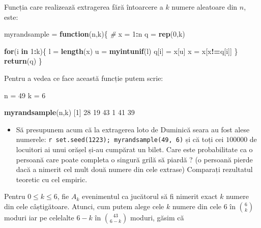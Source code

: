 \documentclass[]{article}
\newenvironment{Shaded}{\begin{snugshade}}{\end{snugshade}}
\newcommand{\CommentTok}[1]{\textcolor[rgb]{0.56,0.35,0.01}{\textit{#1}}}
\newcommand{\ControlFlowTok}[1]{\textcolor[rgb]{0.13,0.29,0.53}{\textbf{#1}}}
\newcommand{\DecValTok}[1]{\textcolor[rgb]{0.00,0.00,0.81}{#1}}
\newcommand{\KeywordTok}[1]{\textcolor[rgb]{0.13,0.29,0.53}{\textbf{#1}}}
\newcommand{\NormalTok}[1]{#1}
\newcommand{\OperatorTok}[1]{\textcolor[rgb]{0.81,0.36,0.00}{\textbf{#1}}}
\newcommand{\StringTok}[1]{\textcolor[rgb]{0.31,0.60,0.02}{#1}}
\newenvironment{frshaded*}{%
  \def\FrameCommand{\fboxrule=\FrameRule\fboxsep=\FrameSep \fcolorbox{framecolor}{shadecolor1}}%
  \MakeFramed {\advance\hsize-\width \FrameRestore}}%
{\endMakeFramed}
\newenvironment{rmdblock}[1]
  {\begin{frshaded*}
  \begin{itemize}
  \renewcommand{\labelitemi}{
    \raisebox{-.7\height}[0pt][0pt]{
      {\setkeys{Gin}{width=2em,keepaspectratio}\texttt{[image: images/icons/\#1]}}
    }
  }
  \item
  }
  {
  \end{itemize}
  \end{frshaded*}
  }
\newenvironment{rmdexercise}
  {\begin{rmdblock}{exercise}}
  {\end{rmdblock}}
\begin{document}
Funcția care realizează extragerea fără întoarcere a \(k\) numere
aleatoare din \(n\), este:

\begin{Shaded}
\begin{Highlighting}[]
\NormalTok{myrandsample =}\StringTok{ }\ControlFlowTok{function}\NormalTok{(n,k)\{}
  \CommentTok{# }
\NormalTok{  x =}\StringTok{ }\DecValTok{1}\OperatorTok{:}\NormalTok{n}
\NormalTok{  q =}\StringTok{ }\KeywordTok{rep}\NormalTok{(}\DecValTok{0}\NormalTok{,k)}
  
  \ControlFlowTok{for}\NormalTok{(i }\ControlFlowTok{in} \DecValTok{1}\OperatorTok{:}\NormalTok{k)\{}
\NormalTok{    l =}\StringTok{ }\KeywordTok{length}\NormalTok{(x)}
\NormalTok{    u =}\StringTok{ }\KeywordTok{myintunif}\NormalTok{(l)}
\NormalTok{    q[i] =}\StringTok{ }\NormalTok{x[u]}
\NormalTok{    x =}\StringTok{ }\NormalTok{x[x}\OperatorTok{!=}\NormalTok{q[i]]}
\NormalTok{  \}}
  \KeywordTok{return}\NormalTok{(q)}
\NormalTok{\}}
\end{Highlighting}
\end{Shaded}

Pentru a vedea ce face această funcție putem scrie:

\begin{Shaded}
\begin{Highlighting}[]
\NormalTok{n =}\StringTok{ }\DecValTok{49}
\NormalTok{k =}\StringTok{ }\DecValTok{6}

\KeywordTok{myrandsample}\NormalTok{(n,k)}
\NormalTok{[}\DecValTok{1}\NormalTok{] }\DecValTok{28} \DecValTok{19} \DecValTok{43}  \DecValTok{1} \DecValTok{41} \DecValTok{39}
\end{Highlighting}
\end{Shaded}

\begin{rmdexercise}
Să presupunem acum că la extragerea loto de Duminică seara au fost alese
numerele: \texttt{r\ set.seed(1223);\ myrandsample(49,\ 6)} și că toți
cei \(100000\) de locuitori ai unui orășel și-au cumpărat un bilet. Care
este probabilitate ca o persoană care poate completa o singură grilă să
piardă ? (o persoană pierde dacă a nimerit cel mult două numere din cele
extrase) Comparați rezultatul teoretic cu cel empiric.
\end{rmdexercise}

Pentru \(0\leq k \leq 6\), fie \(A_k\) evenimentul ca jucătorul să fi
nimerit exact \(k\) numere din cele câștigătoare. Atunci, cum putem
alege cele \(k\) numere din cele \(6\) în \(\binom{6}{k}\) moduri iar pe
celelalte \(6 - k\) în \(\binom{43}{6-k}\) moduri, găsim că
\end{document}
